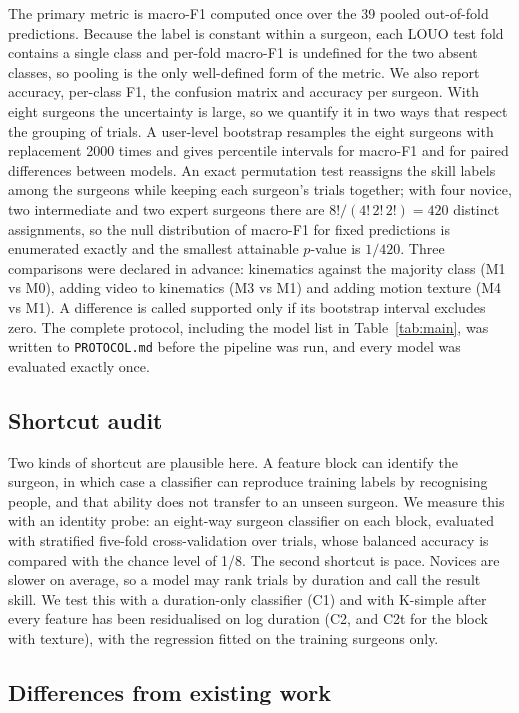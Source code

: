 The primary metric is macro-F1 computed once over the 39 pooled out-of-fold predictions. Because the label is constant within a surgeon, each LOUO test fold contains a single class and per-fold macro-F1 is undefined for the two absent classes, so pooling is the only well-defined form of the metric. We also report accuracy, per-class F1, the confusion matrix and accuracy per surgeon. With eight surgeons the uncertainty is large, so we quantify it in two ways that respect the grouping of trials. A user-level bootstrap resamples the eight surgeons with replacement 2000 times and gives percentile intervals for macro-F1 and for paired differences between models. An exact permutation test reassigns the skill labels among the surgeons while keeping each surgeon's trials together; with four novice, two intermediate and two expert surgeons there are $8!/(4!\,2!\,2!) = 420$ distinct assignments, so the null distribution of macro-F1 for fixed predictions is enumerated exactly and the smallest attainable $p$-value is $1/420$. Three comparisons were declared in advance: kinematics against the majority class (M1 vs M0), adding video to kinematics (M3 vs M1) and adding motion texture (M4 vs M1). A difference is called supported only if its bootstrap interval excludes zero. The complete protocol, including the model list in Table~\ref{tab:main}, was written to \texttt{PROTOCOL.md} before the pipeline was run, and every model was evaluated exactly once.

\subsection{Shortcut audit}

Two kinds of shortcut are plausible here. A feature block can identify the surgeon, in which case a classifier can reproduce training labels by recognising people, and that ability does not transfer to an unseen surgeon. We measure this with an identity probe: an eight-way surgeon classifier on each block, evaluated with stratified five-fold cross-validation over trials, whose balanced accuracy is compared with the chance level of 1/8. The second shortcut is pace. Novices are slower on average, so a model may rank trials by duration and call the result skill. We test this with a duration-only classifier (C1) and with K-simple after every feature has been residualised on log duration (C2, and C2t for the block with texture), with the regression fitted on the training surgeons only.

\subsection{Differences from existing work}
\label{sec:differences}

